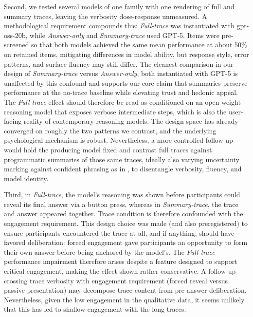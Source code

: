 \documentclass[manuscript, anonymous=false,authorversion,review=false]{acmart}
\begin{document}
Second, we tested several models of one family with one rendering of full and summary traces, leaving the verbosity dose-response unmeasured. A methodological requirement compounds this: \textit{Full-trace} was instantiated with gpt-oss-20b, while \textit{Answer-only} and \textit{Summary-trace} used GPT-5. Items were pre-screened so that both models achieved the same mean performance at about 50\% on retained items, mitigating differences in model ability, but response style, error patterns, and surface fluency may still differ. The cleanest comparison in our design of \textit{Summary-trace} versus \textit{Answer-only}, both instantiated with GPT-5 is unaffected by this confound and supports our core claim that summaries preserve performance at the no-trace baseline while elevating trust and hedonic appeal. The \textit{Full-trace} effect should therefore be read as conditioned on an open-weight reasoning model that exposes verbose intermediate steps, which is also the user-facing reality of contemporary reasoning models. The design space has already converged on roughly the two patterns we contrast, and the underlying psychological mechanism is robust. Nevertheless, a more controlled follow-up would hold the producing model fixed and contrast full traces against programmatic summaries of those same traces, ideally also varying uncertainty marking against confident phrasing as in \citet{kim2024m}, to disentangle verbosity, fluency, and model identity.

Third, in \textit{Full-trace}, the model's reasoning was shown before participants could reveal its final answer via a button press, whereas in \textit{Summary-trace}, the trace and answer appeared together. Trace condition is therefore confounded with the engagement requirement. This design choice was made (and also preregistered) to ensure participants encountered the trace at all, and if anything, should have favored deliberation: forced engagement gave participants an opportunity to form their own answer before being anchored by the model's. The \textit{Full-trace} performance impairment therefore arises despite a feature designed to support critical engagement, making the effect shown rather conservative. A follow-up crossing trace verbosity with engagement requirement (forced reveal versus passive presentation) may decompose trace content from pre-answer deliberation. Nevertheless, given the low engagement in the qualitative data, it seems unlikely that this has led to shallow engagement with the long traces. 
\end{document}
